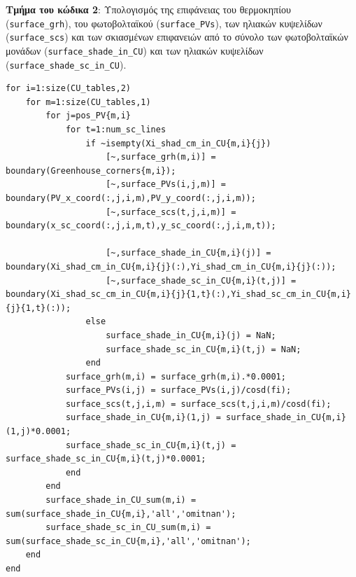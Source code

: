 \documentclass[12pt, a4paper]{report} %
\newcommand{\english}{\foreignlanguage{english}}
\begin{document}
\noindent \textbf{Τμήμα του κώδικα 2}: Υπολογισμός της επιφάνειας του θερμοκηπίου (\texttt{\english{surface\_grh}}), του φωτοβολταϊκού 
(\texttt{\english{surface\_PVs}}), των ηλιακών κυψελίδων (\texttt{\english{surface\_scs}}) και των σκιασμένων επιφανειών από το 
σύνολο των φωτοβολταϊκών μονάδων (\texttt{\english{surface\_shade\_in\_CU}}) και των ηλιακών κυψελίδων 
(\texttt{\english{surface\_shade\_sc\_in\_CU}}).
\begin{lstlisting}
for i=1:size(CU_tables,2)
    for m=1:size(CU_tables,1)
        for j=pos_PV{m,i}
            for t=1:num_sc_lines
                if ~isempty(Xi_shad_cm_in_CU{m,i}{j})
                    [~,surface_grh(m,i)] = boundary(Greenhouse_corners{m,i});
                    [~,surface_PVs(i,j,m)] = boundary(PV_x_coord(:,j,i,m),PV_y_coord(:,j,i,m));
                    [~,surface_scs(t,j,i,m)] = boundary(x_sc_coord(:,j,i,m,t),y_sc_coord(:,j,i,m,t));

                    [~,surface_shade_in_CU{m,i}(j)] = boundary(Xi_shad_cm_in_CU{m,i}{j}(:),Yi_shad_cm_in_CU{m,i}{j}(:));
                    [~,surface_shade_sc_in_CU{m,i}(t,j)] = boundary(Xi_shad_sc_cm_in_CU{m,i}{j}{1,t}(:),Yi_shad_sc_cm_in_CU{m,i}{j}{1,t}(:));
                else
                    surface_shade_in_CU{m,i}(j) = NaN;
                    surface_shade_sc_in_CU{m,i}(t,j) = NaN;
                end
            surface_grh(m,i) = surface_grh(m,i).*0.0001;
            surface_PVs(i,j) = surface_PVs(i,j)/cosd(fi);
            surface_scs(t,j,i,m) = surface_scs(t,j,i,m)/cosd(fi);
            surface_shade_in_CU{m,i}(1,j) = surface_shade_in_CU{m,i}(1,j)*0.0001;
            surface_shade_sc_in_CU{m,i}(t,j) = surface_shade_sc_in_CU{m,i}(t,j)*0.0001;
            end
        end
        surface_shade_in_CU_sum(m,i) = sum(surface_shade_in_CU{m,i},'all','omitnan');
        surface_shade_sc_in_CU_sum(m,i) = sum(surface_shade_sc_in_CU{m,i},'all','omitnan');
    end
end 
\end{lstlisting}
\end{document}
